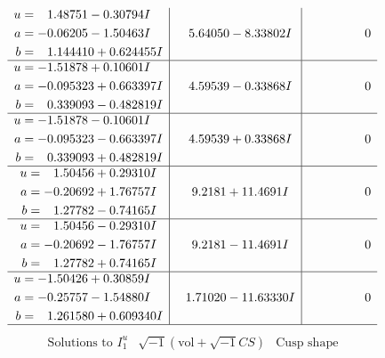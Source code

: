 \documentclass[1p]{elsarticle_modified}
\theoremstyle{definition}
\newcommand{\I}{\sqrt{-1}}
\begin{document}
$$\begin{array}{c|c|c}
\begin{aligned}
u &= \phantom{-}1.48751 - 0.30794 I \\
a &= -0.06205 - 1.50463 I \\
b &= \phantom{-}1.144410 + 0.624455 I\end{aligned}
 & \phantom{-}5.64050 - 8.33802 I & \phantom{-0.000000 } 0 \\ \hline\begin{aligned}
u &= -1.51878 + 0.10601 I \\
a &= -0.095323 + 0.663397 I \\
b &= \phantom{-}0.339093 - 0.482819 I\end{aligned}
 & \phantom{-}4.59539 - 0.33868 I & \phantom{-0.000000 } 0 \\ \hline\begin{aligned}
u &= -1.51878 - 0.10601 I \\
a &= -0.095323 - 0.663397 I \\
b &= \phantom{-}0.339093 + 0.482819 I\end{aligned}
 & \phantom{-}4.59539 + 0.33868 I & \phantom{-0.000000 } 0 \\ \hline\begin{aligned}
u &= \phantom{-}1.50456 + 0.29310 I \\
a &= -0.20692 + 1.76757 I \\
b &= \phantom{-}1.27782 - 0.74165 I\end{aligned}
 & \phantom{-}9.2181 + 11.4691 I & \phantom{-0.000000 } 0 \\ \hline\begin{aligned}
u &= \phantom{-}1.50456 - 0.29310 I \\
a &= -0.20692 - 1.76757 I \\
b &= \phantom{-}1.27782 + 0.74165 I\end{aligned}
 & \phantom{-}9.2181 - 11.4691 I & \phantom{-0.000000 } 0 \\ \hline\begin{aligned}
u &= -1.50426 + 0.30859 I \\
a &= -0.25757 - 1.54880 I \\
b &= \phantom{-}1.261580 + 0.609340 I\end{aligned}
 & \phantom{-}1.71020 - 11.63330 I & \phantom{-0.000000 } 0\\
 \hline 
 \end{array}$$\newpage$$\begin{array}{c|c|c}  
\text{Solutions to }I^u_{1}& \I (\text{vol} + \sqrt{-1}CS) & \text{Cusp shape}\\
 \hline 
\begin{aligned}

\end{aligned}
\end{array}$$
\end{document}
